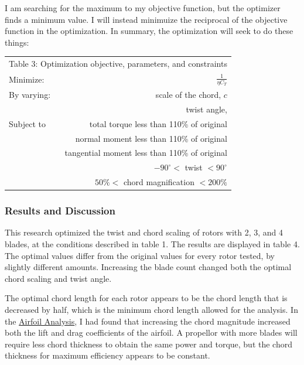 \documentclass{article}
\begin{document}
\raggedright
I am searching for the maximum to my objective function, but the optimizer finds a minimum value. I will instead minimuize the reciprocal of the objective function in the optimization. In summary, the optimization will seek to do these things: \newline

\begin{tabular}{l  r}
	 \multicolumn{2}{c}{Table 3: Optimization objective, parameters, and constraints}  \\
  	Minimize: & $\frac{1}{\eta C_{T}}$ \\ \hline
  	By varying: & scale of the chord, $c$ \\ 
  	 & twist angle, \\  \hline
  	Subject to & total torque less than 110\% of original \\ 
	 & normal moment less than 110\% of original \\ 
	 & tangential moment less than 110\% of original \\ 
	 & $-90^{\circ} <$ twist $< 90^{\circ}$ \\
	 & $50\% <$ chord magnification $< 200\% $
\end{tabular} \newline

\subsubsection*{Results and Discussion}

This research optimized the twist and chord scaling of rotors with 2, 3, and 4 blades, at the conditions described in table 1. The results are displayed in table 4. The optimal values differ from the original values for every rotor tested, by slightly different amounts. Increasing the blade count changed both the optimal chord scaling and twist angle. \newline

The optimal chord length for each rotor appears to be the chord length that is decreased by half, which is the minimum chord length allowed for the analysis. In the \href{https://github.com/JoeSpencer1/497R-Projects/blob/main/Airfoil Analysis/Airfoil_Analysis.pdf}{Airfoil Analysis}, I had found that increasing the chord magnitude increased both the lift and drag coefficients of the airfoil. A propellor with more blades will require less chord thickness to obtain the same power and torque, but the chord thickness for maximum efficiency appears to be constant. \newline
\end{document}
